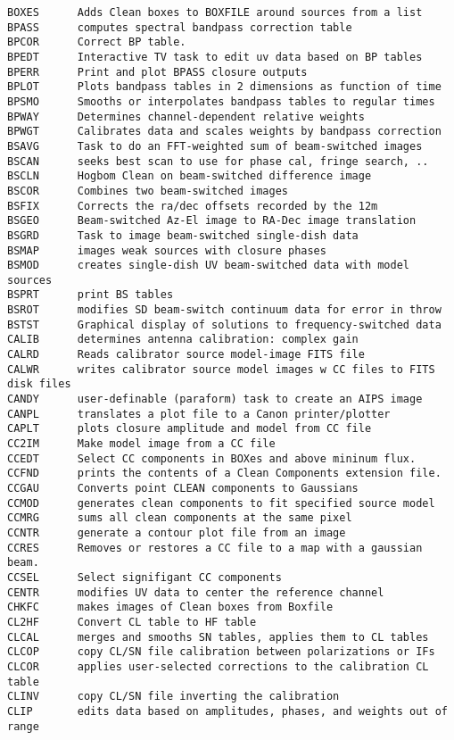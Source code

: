 \begin{verbatim}
BOXES      Adds Clean boxes to BOXFILE around sources from a list
BPASS      computes spectral bandpass correction table
BPCOR      Correct BP table.
BPEDT      Interactive TV task to edit uv data based on BP tables
BPERR      Print and plot BPASS closure outputs
BPLOT      Plots bandpass tables in 2 dimensions as function of time
BPSMO      Smooths or interpolates bandpass tables to regular times
BPWAY      Determines channel-dependent relative weights
BPWGT      Calibrates data and scales weights by bandpass correction
BSAVG      Task to do an FFT-weighted sum of beam-switched images
BSCAN      seeks best scan to use for phase cal, fringe search, ..
BSCLN      Hogbom Clean on beam-switched difference image
BSCOR      Combines two beam-switched images
BSFIX      Corrects the ra/dec offsets recorded by the 12m
BSGEO      Beam-switched Az-El image to RA-Dec image translation
BSGRD      Task to image beam-switched single-dish data
BSMAP      images weak sources with closure phases
BSMOD      creates single-dish UV beam-switched data with model sources
BSPRT      print BS tables
BSROT      modifies SD beam-switch continuum data for error in throw
BSTST      Graphical display of solutions to frequency-switched data
CALIB      determines antenna calibration: complex gain
CALRD      Reads calibrator source model-image FITS file
CALWR      writes calibrator source model images w CC files to FITS disk files
CANDY      user-definable (paraform) task to create an AIPS image
CANPL      translates a plot file to a Canon printer/plotter
CAPLT      plots closure amplitude and model from CC file
CC2IM      Make model image from a CC file
CCEDT      Select CC components in BOXes and above mininum flux.
CCFND      prints the contents of a Clean Components extension file.
CCGAU      Converts point CLEAN components to Gaussians
CCMOD      generates clean components to fit specified source model
CCMRG      sums all clean components at the same pixel
CCNTR      generate a contour plot file from an image
CCRES      Removes or restores a CC file to a map with a gaussian beam.
CCSEL      Select signifigant CC components
CENTR      modifies UV data to center the reference channel
CHKFC      makes images of Clean boxes from Boxfile
CL2HF      Convert CL table to HF table
CLCAL      merges and smooths SN tables, applies them to CL tables
CLCOP      copy CL/SN file calibration between polarizations or IFs
CLCOR      applies user-selected corrections to the calibration CL table
CLINV      copy CL/SN file inverting the calibration
CLIP       edits data based on amplitudes, phases, and weights out of range

\end{verbatim}
